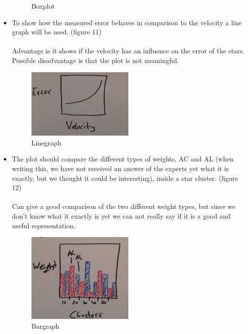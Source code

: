 \documentclass{article}
\begin{document}
\begin{itemize}
\begin{figure}[!h]
	\caption{Boxplot }
	\label{fig10}
\end{figure}
\item To show how the measured error behaves in comparison to the velocity a line graph will be used. (figure 11)\\
\\
Advantage is it shows if the velocity has an influence on the error of the stars. Possible disadvantage is that the plot is not meaningful.
\begin{figure}[!h]
\centering
\includegraphics[width=0.5\textwidth]{images/VelocityError.jpg}
	\caption{Linegraph  }
	\label{fig11}
\end{figure}
\newpage\item The plot should compare the different types of weights, AC and AL (when writing this, we have not received an answer of the experts yet what it is exactly, but we thought it could be interesting), inside a star cluster. (figure 12)\\
\\
Can give a good comparison of the two different weight types, but since we don't know what it exactly is yet we can not really say if it is a good and useful representation.
\begin{figure}[!h]
\centering
\includegraphics[width=0.5\textwidth]{images/ClustersWeight.jpg}
	\caption{Bargraph  }
	\label{fig12}
\end{figure}
\end{itemize}

\newpage
\end{document}
